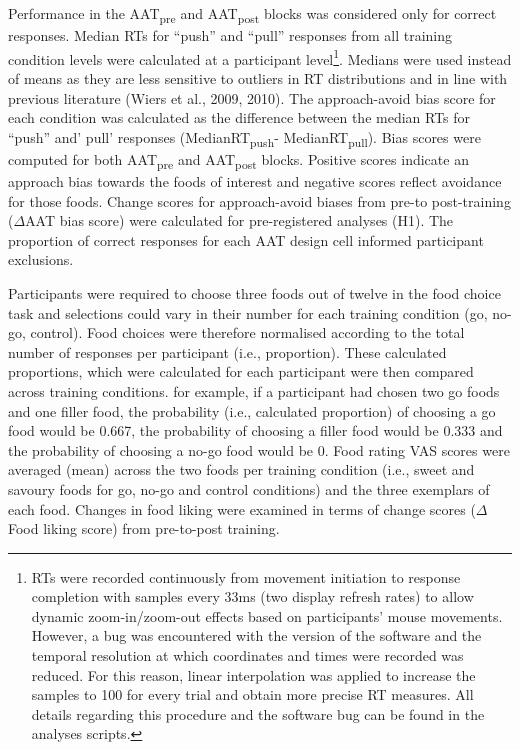\documentclass[man,floatsintext]{apa6}
\let\rmarkdownfootnote\footnote%
\def\footnote{\protect\rmarkdownfootnote}
\begin{document}
\par

Performance in the AAT\textsubscript{pre} and AAT\textsubscript{post} blocks was considered only for correct responses. Median RTs for \enquote{push} and \enquote{pull} responses from all training condition levels were calculated at a participant level\footnote{RTs were recorded continuously from movement initiation to response completion with samples every 33ms (two display refresh rates) to allow dynamic zoom-in/zoom-out effects based on participants' mouse movements. However, a bug was encountered with the version of the software and the temporal resolution at which coordinates and times were recorded was reduced. For this reason, linear interpolation was applied to increase the samples to 100 for every trial and obtain more precise RT measures. All details regarding this procedure and the software bug can be found in the analyses scripts.}. Medians were used instead of means as they are less sensitive to outliers in RT distributions and in line with previous literature (Wiers et al., 2009, 2010). The approach-avoid bias score for each condition was calculated as the difference between the median RTs for \enquote{push} and' pull' responses (MedianRT\textsubscript{push}- MedianRT\textsubscript{pull}). Bias scores were computed for both AAT\textsubscript{pre} and AAT\textsubscript{post} blocks. Positive scores indicate an approach bias towards the foods of interest and negative scores reflect avoidance for those foods. Change scores for approach-avoid biases from pre-to post-training (\(\Delta\)AAT bias score) were calculated for pre-registered analyses (H1). The proportion of correct responses for each AAT design cell informed participant exclusions.

\par

Participants were required to choose three foods out of twelve in the food choice task and selections could vary in their number for each training condition (go, no-go, control). Food choices were therefore normalised according to the total number of responses per participant (i.e., proportion). These calculated proportions, which were calculated for each participant were then compared across training conditions. for example, if a participant had chosen two go foods and one filler food, the probability (i.e., calculated proportion) of choosing a go food would be 0.667, the probability of choosing a filler food would be 0.333 and the probability of choosing a no-go food would be 0. Food rating VAS scores were averaged (mean) across the two foods per training condition (i.e., sweet and savoury foods for go, no-go and control conditions) and the three exemplars of each food. Changes in food liking were examined in terms of change scores (\(\Delta\)Food liking score) from pre-to-post training.
\end{document}
